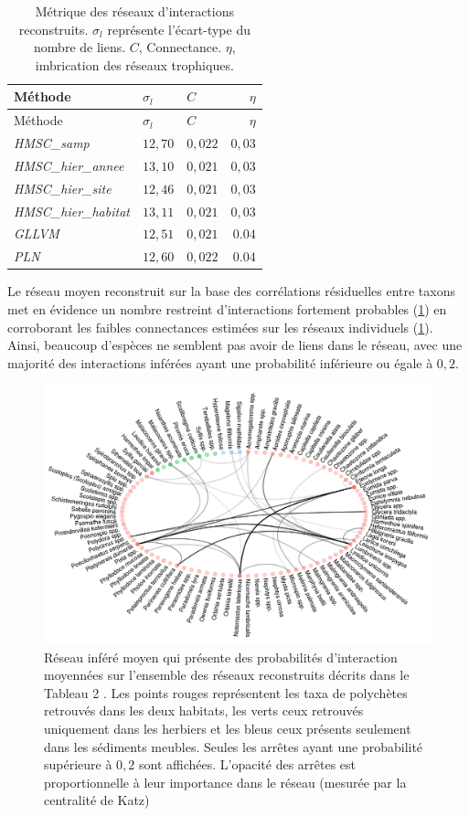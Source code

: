 \documentclass[12pt,]{article}
\makeatletter
\def\maxwidth{\ifdim\Gin@nat@width>\linewidth\linewidth
\else\Gin@nat@width\fi}
\let\Oldincludegraphics\includegraphics
\renewcommand{\includegraphics}[1]{\Oldincludegraphics[width=\maxwidth]{#1}}
\makeatother
\begin{document}
{\small
\begin{longtable}[]{@{}lllr@{}}
\caption{Métrique des réseaux d'interactions reconstruits. \(\sigma_l\)
représente l'écart-type du nombre de liens. \(C\), Connectance.
\(\eta\), imbrication des réseaux trophiques.
\label{tbl:metrics}}\tabularnewline
\toprule
Méthode & \(\sigma_l\) & \(C\) & \(\eta\)\tabularnewline
\midrule
\endfirsthead
\toprule
Méthode & \(\sigma_l\) & \(C\) & \(\eta\)\tabularnewline
\midrule
\endhead
\emph{HMSC\_samp} & \(12,70\) & \(0,022\) & \(0,03\)\tabularnewline
\emph{HMSC\_hier\_annee} & \(13,10\) & \(0,021\) &
\(0,03\)\tabularnewline
\emph{HMSC\_hier\_site} & \(12,46\) & \(0,021\) &
\(0,03\)\tabularnewline
\emph{HMSC\_hier\_habitat} & \(13,11\) & \(0,021\) &
\(0,03\)\tabularnewline
\emph{GLLVM} & \(12,51\) & \(0,021\) & \(0.04\)\tabularnewline
\emph{PLN} & \(12,60\) & \(0,022\) & \(0.04\)\tabularnewline
\bottomrule
\end{longtable}}\FloatBarrier


Le réseau moyen reconstruit sur la base des corrélations résiduelles
entre taxons met en évidence un nombre restreint d'interactions
fortement probables (\cref{fig:meannet}) en corroborant les faibles
connectances estimées sur les réseaux individuels (\cref{tbl:metrics}).
Ainsi, beaucoup d'espèces ne semblent pas avoir de liens dans le réseau,
avec une majorité des interactions inférées ayant une probabilité
inférieure ou égale à \(0,2\).

\begin{figure}
\hypertarget{fig:meannet}{%
\centering
\includegraphics{figures/mean-network-1.png}
\caption{Réseau inféré moyen qui présente des probabilités d'interaction
moyennées sur l'ensemble des réseaux reconstruits décrits dans le
Tableau 2 . Les points rouges représentent les taxa de polychètes
retrouvés dans les deux habitats, les verts ceux retrouvés uniquement
dans les herbiers et les bleus ceux présents seulement dans les
sédiments meubles. Seules les arrêtes ayant une probabilité supérieure à
\(0,2\) sont affichées. L'opacité des arrêtes est proportionnelle à leur
importance dans le réseau (mesurée par la centralité de
Katz)}\label{fig:meannet}
}
\end{figure}
\end{document}
